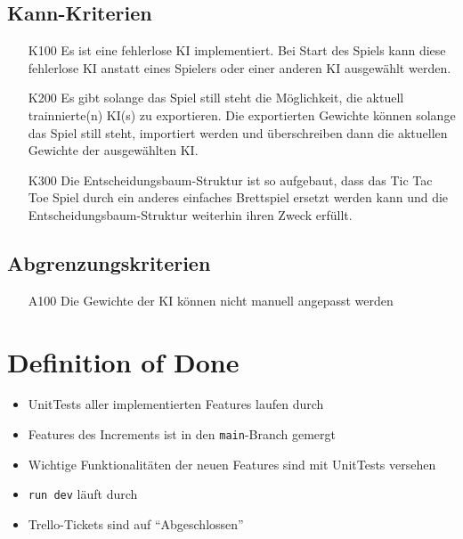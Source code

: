 \documentclass[titlepage]{scrartcl}
\begin{document}
\subsection{Kann-Kriterien}
	\begin{itemize}
		\item[K100] Es ist eine fehlerlose KI implementiert. Bei Start des Spiels kann diese fehlerlose KI anstatt eines Spielers oder einer anderen KI ausgewählt werden.
		\item[K200] Es gibt solange das Spiel still steht die Möglichkeit, die aktuell trainnierte(n) KI(s) zu exportieren. Die exportierten Gewichte können solange das Spiel still steht, importiert werden und überschreiben dann die aktuellen Gewichte der ausgewählten KI.
		\item[K300] Die Entscheidungsbaum-Struktur ist so aufgebaut, dass das Tic Tac Toe Spiel durch ein anderes einfaches Brettspiel ersetzt werden kann und die Entscheidungsbaum-Struktur weiterhin ihren Zweck erfüllt.
	\end{itemize}
	
\subsection{Abgrenzungskriterien}
	\begin{itemize}
		\item[A100] Die Gewichte der KI können nicht manuell angepasst werden
	\end{itemize}
	
\section{Definition of Done}%
\begin{itemize}
	\item UnitTests aller implementierten Features laufen durch
	\item Features des Increments ist in den \texttt{main}-Branch gemergt
	\item Wichtige Funktionalitäten der neuen Features sind mit UnitTests versehen
	\item \texttt{run dev} läuft durch
	\item Trello-Tickets sind auf "`Abgeschlossen"'
\end{itemize}
\end{document}
